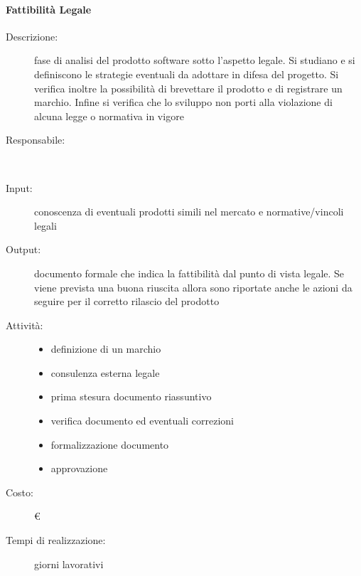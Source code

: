 \paragraph{Fattibilità Legale}
\begin{description}
\item[Descrizione:] fase di analisi del prodotto software sotto l'aspetto legale. Si studiano e
si definiscono le strategie eventuali da adottare in difesa del progetto. Si verifica inoltre
la possibilità di brevettare il prodotto e di registrare un marchio. Infine si verifica che
lo sviluppo non porti alla violazione di alcuna legge o normativa in vigore\\

\item[Responsabile:] \\

\item[Input:] conoscenza di eventuali prodotti simili nel mercato e normative/vincoli legali\\

\item[Output:] documento formale che indica la fattibilità dal punto di vista legale. Se viene
prevista una buona riuscita allora sono riportate anche le azioni da seguire per il corretto
rilascio del prodotto\\

\item[Attività:]
\begin{itemize}
\item definizione di un marchio
\item consulenza esterna legale
\item prima stesura documento riassuntivo
\item verifica documento ed eventuali correzioni
\item formalizzazione documento
\item approvazione
\end{itemize}
\item[Costo:] \euro \\
\item[Tempi di realizzazione:]  giorni lavorativi
\end{description}



